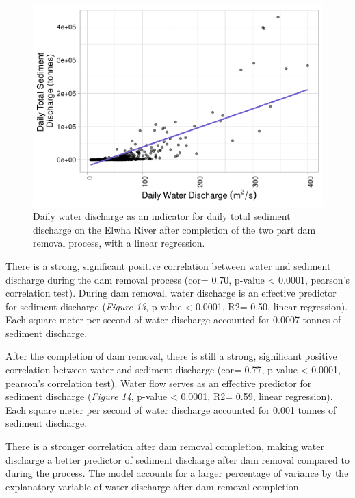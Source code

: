 \documentclass[12pt,]{article}
\begin{document}
\begin{figure}
\centering
\includegraphics{Mason_ENV872_ProjectFinal_files/figure-latex/Linear After (Figure 14)-1.pdf}
\caption{Daily water discharge as an indicator for daily total sediment
discharge on the Elwha River after completion of the two part dam
removal process, with a linear regression.}
\end{figure}

\newpage

There is a strong, significant positive correlation between water and
sediment discharge during the dam removal process (cor= 0.70, p-value
\textless{} 0.0001, pearson's correlation test). During dam removal,
water discharge is an effective predictor for sediment discharge
(\emph{Figure 13}, p-value \textless{} 0.0001, R2= 0.50, linear
regression). Each square meter per second of water discharge accounted
for 0.0007 tonnes of sediment discharge.

After the completion of dam removal, there is still a strong,
significant positive correlation between water and sediment discharge
(cor= 0.77, p-value \textless{} 0.0001, pearson's correlation test).
Water flow serves as an effective predictor for sediment discharge
(\emph{Figure 14}, p-value \textless{} 0.0001, R2= 0.59, linear
regression). Each square meter per second of water discharge accounted
for 0.001 tonnes of sediment discharge.

There is a stronger correlation after dam removal completion, making
water discharge a better predictor of sediment discharge after dam
removal compared to during the process. The model accounts for a larger
percentage of variance by the explanatory variable of water discharge
after dam removal completion.
\end{document}
